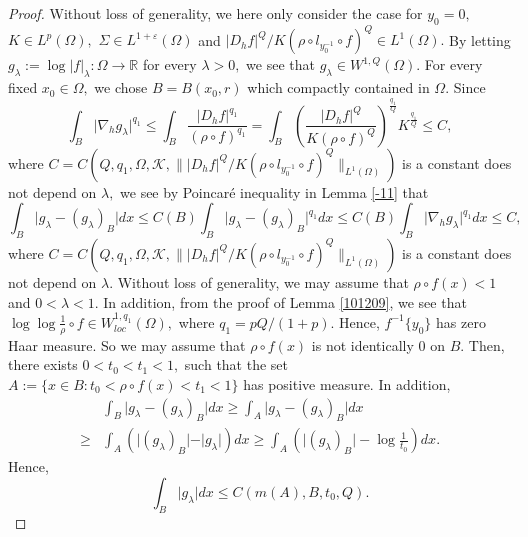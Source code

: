\documentclass[11pt,twoside]{article}
\theoremstyle{definition}
\theoremstyle{remark}
\begin{document}
\begin{proof}
Without loss of generality, we here only consider the case for $y_{0}=0,$ $K\in L^{p}(\Omega),$  $\Sigma\in L^{1+\varepsilon}(\Omega)$ and $\vert D_{h}f\vert^{Q}/K(\rho\circ l_{y_{0}^{-1}}\circ f)^{Q}\in L^{1}(\Omega).$ By letting $g_{\lambda}:=\log\vert f\vert_{\lambda}:\Omega\rightarrow\mathbb{R}$ for every $\lambda>0,$ we see that $g_{\lambda}\in W^{1,Q}(\Omega).$ For every fixed $x_{0}\in\Omega,$ we chose $B=B(x_{0},r)$ which compactly contained in $\Omega.$ Since 
\begin{equation}\label{1009982887}
\int_{B}\vert\nabla_{h}g_{\lambda}\vert^{q_{1}}\leq\int_{B}\frac{\vert D_{h}f\vert^{q_{1}}}{(\rho\circ f)^{q_{1}}}=\int_{B}\left(\frac{\vert D_{h}f\vert^{Q}}{K(\rho\circ f)^{Q}}\right)^{\frac{q_{1}}{Q}}K^{\frac{q_{1}}{Q}}\leq C,
\end{equation}
where $C=C(Q,q_{1},\Omega,\mathcal{K}, \| \vert D_{h}f\vert^{Q}/K(\rho\circ l_{y_{0}^{-1}}\circ f)^{Q}\|_{L^{1}(\Omega)})$ is a constant does not depend on $\lambda,$ we see by Poincar\'{e} inequality in Lemma \ref{-11}  that 
 $$\int_{B}\vert g_{\lambda}-(g_{\lambda})_{B}\vert dx
\leq C(B)\int_{B}\vert g_{\lambda}-(g_{\lambda})_{B}\vert^{q_{1}} dx\leq C(B)\int_{B}\vert \nabla_{h}g_{\lambda}\vert^{q_{1}} dx\leq C,$$
 where $C=C(Q,q_{1},\Omega,\mathcal{K}, \| \vert D_{h}f\vert^{Q}/K(\rho\circ l_{y_{0}^{-1}}\circ f)^{Q}\|_{L^{1}(\Omega)})$ is a constant does not depend on $\lambda.$ 
 Without loss of generality, we may assume that $\rho\circ f(x)<1$ and $0<\lambda<1.$ In addition, from the proof of Lemma  \ref{101209},  we see that $\log\log\frac{1}{\rho}\circ f\in W_{loc}^{1,q_{1}}(\Omega),$ where $q_{1}=pQ/(1+p).$ Hence, $f^{-1}\{y_{0}\}$ has zero Haar measure. So we may assume that $\rho\circ f(x)$ is not identically $0$ on $B.$ Then, there exists $0<t_{0}<t_{1}<1,$ such that the set $A:=\{x\in B:t_{0}<\rho\circ f(x)<t_{1}<1\}$ has positive  measure. In addition, 
 \begin{equation}
\begin{aligned}
&\int_{B}\vert g_{\lambda}-(g_{\lambda})_{B}\vert dx\geq\int_{A}\vert g_{\lambda}-(g_{\lambda})_{B}\vert dx\\
\geq&\int_{A}(\vert (g_{\lambda})_{B}\vert-\vert g_{\lambda}\vert )dx\geq\int_{A}(\vert (g_{\lambda})_{B}\vert-\log\frac{1}{t_{0}})dx.
\end{aligned}
\end{equation}
  Hence,
  \begin{equation}\label{0009j}
  \int_{B}\vert g_{\lambda}\vert dx\leq C(m(A),B,t_{0},Q).

\end{equation}
\end{proof}
\end{document}
